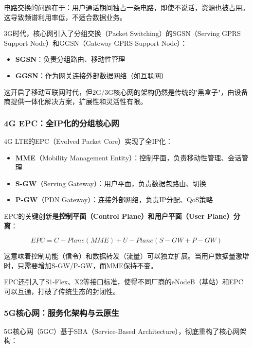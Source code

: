 电路交换的问题在于：用户通话期间独占一条电路，即使不说话，资源也被占用。这导致频谱利用率低，不适合数据业务。

3G时代，核心网引入了分组交换（Packet Switching）的SGSN（Serving GPRS Support Node）和GGSN（Gateway GPRS Support Node）：

\begin{itemize}
    \item \textbf{SGSN}：负责分组路由、移动性管理
    \item \textbf{GGSN}：作为网关连接外部数据网络（如互联网）
\end{itemize}

这开启了移动互联网时代，但2G/3G核心网的架构仍然是传统的"黑盒子"，由设备商提供一体化解决方案，扩展性和灵活性有限。

\subsubsection{4G EPC：全IP化的分组核心网}

4G LTE的EPC（Evolved Packet Core）实现了全IP化：

\begin{itemize}
    \item \textbf{MME}（Mobility Management Entity）：控制平面，负责移动性管理、会话管理
    \item \textbf{S-GW}（Serving Gateway）：用户平面，负责数据包路由、切换
    \item \textbf{P-GW}（PDN Gateway）：连接外部网络，负责IP分配、QoS策略
\end{itemize}

EPC的关键创新是\textbf{控制平面（Control Plane）和用户平面（User Plane）分离}：

\begin{equation}
EPC = C-Plane (MME) + U-Plane (S-GW + P-GW)
\end{equation}

这意味着控制功能（信令）和数据转发（流量）可以独立扩展。当用户数据量激增时，只需要增加S-GW/P-GW，而MME保持不变。

EPC还引入了S1-Flex、X2等接口标准，使得不同厂商的eNodeB（基站）和EPC可以互通，打破了传统生态的封闭性。

\subsubsection{5G核心网：服务化架构与云原生}

5G核心网（5GC）基于SBA（Service-Based Architecture），彻底重构了核心网架构：

